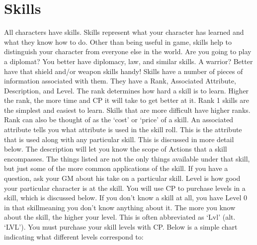 \documentclass[twoside]{book}
\begin{document}
\section{Skills}
     All characters have skills. Skills represent what your
             character has learned and what they know how to do. Other
             than being useful in game, skills help to distinguish your
             character from everyone else in the world. Are you going to
             play a diplomat? You better have diplomacy, law, and similar
             skills. A warrior? Better have that shield and/or weapon
             skills handy!  Skills have a number of pieces of information
             associated with them. They have a Rank, Associated
             Attribute, Description, and Level.  The rank determines how hard a skill is to learn.
             Higher the rank, the more time and CP it will take to get
             better at it. Rank 1 skills are the simplest and easiest to
             learn. Skills that are more difficult have higher ranks.
             Rank can also be thought of as the `cost' or
             `price' of a skill.  An associated attribute tells you what attribute is
             used in the skill roll. This is the attribute that is used
             along with any particular skill. This is discussed in more
             detail below.  The description will let you know the scope of Actions
             that a skill encompasses. The things listed are not the only
             things available under that skill, but just some of the more
             common applications of the skill. If you have a question,
             ask your GM about his take on a particular skill.  Level is how good your particular character is at the
             skill. You will use CP to purchase levels in a skill, which
             is discussed below. If you don't know a skill at all,
             you have Level 0 in that skillmeaning you don't
             know anything about it. The more you know about the skill,
             the higher your level. This is often abbreviated as
             `Lvl' (alt. `LVL'). You must
             purchase your skill levels with CP. Below is a simple chart
             indicating what different levels correspond to: 
\end{document}
